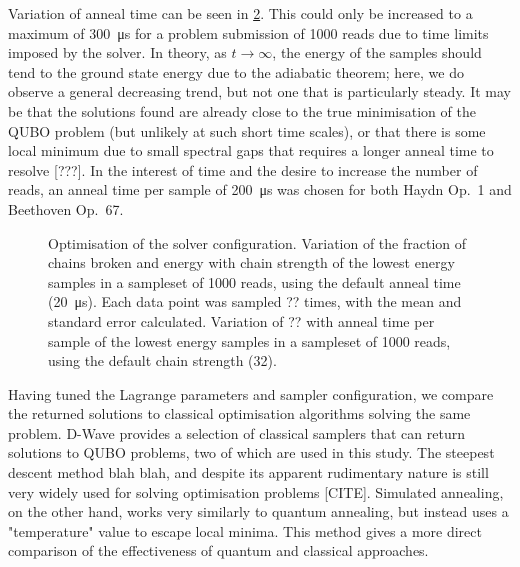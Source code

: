\documentclass[12pt]{article}
\theoremstyle{definition}
\begin{document}
Variation of anneal time can be seen in \cref{fig:anneal-time}. This could only be increased to a maximum of \qty{300}{\us} for a problem submission of \num{1000} reads due to time limits imposed by the solver. In theory, as $t\to\infty$, the energy of the samples should tend to the ground state energy due to the adiabatic theorem; here, we do observe a general decreasing trend, but not one that is particularly steady. It may be that the solutions found are already close to the true minimisation of the QUBO problem (but unlikely at such short time scales), or that there is some local minimum due to small spectral gaps that requires a longer anneal time to resolve [???]. In the interest of time and the desire to increase the number of reads, an anneal time per sample of \qty{200}{\us} was chosen for both Haydn Op.\ 1 and Beethoven Op.\ 67.

\begin{figure}
    \centering\tiny
    \begin{subfigure}[t]{.5\textwidth}
        \centering
        
        \caption{}
        \label{fig:chain-strength}
    \end{subfigure}\hfill
    \begin{subfigure}[t]{.5\textwidth}
        \centering
        
        \caption{}
        \label{fig:anneal-time}
    \end{subfigure}
    
    \caption[Optimisation of the solver configuration.]{Optimisation of the solver configuration.  Variation of the fraction of chains broken and energy with chain strength of the lowest energy samples in a sampleset of 1000 reads, using the default anneal time (\qty{20}{\us}). Each data point was sampled ?? times, with the mean and standard error calculated.  Variation of ?? with anneal time per sample of the lowest energy samples in a sampleset of 1000 reads, using the default chain strength (\num{32}).}
    \label{fig:solver-configuration}
\end{figure}

Having tuned the Lagrange parameters and sampler configuration, we compare the returned solutions to classical optimisation algorithms solving the same problem. D-Wave provides a selection of classical samplers that can return solutions to QUBO problems, two of which are used in this study. The steepest descent method blah blah, and despite its apparent rudimentary nature is still very widely used for solving optimisation problems [CITE]. Simulated annealing, on the other hand, works very similarly to quantum annealing, but instead uses a "temperature" value to escape local minima. This method gives a more direct comparison of the effectiveness of quantum and classical approaches.
\end{document}
